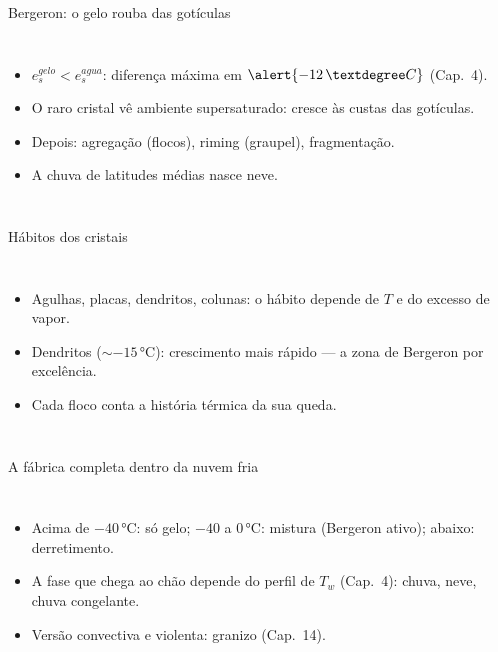 \documentclass[aspectratio=169,11pt]{beamer}
\begin{document}
\begin{frame}{Bergeron: o gelo rouba das gotículas}
  \begin{columns}
    \begin{itemize}
      \item $e_s^{gelo} < e_s^{agua}$: diferença máxima em
            $\alert{-12\,°C}$ (Cap.~4).
      \item O raro cristal vê ambiente supersaturado: cresce às custas
            das gotículas.
      \item Depois: agregação (flocos), riming (graupel),
            fragmentação.
      \item A chuva de latitudes médias nasce \alert{neve}.
    \end{itemize}
  \end{columns}
\end{frame}

\begin{frame}{Hábitos dos cristais}
  \begin{columns}
    \begin{itemize}
      \item Agulhas, placas, dendritos, colunas: o hábito depende de
            $T$ e do excesso de vapor.
      \item Dendritos ($\sim-15\,°$C): crescimento mais rápido — a zona
            de Bergeron por excelência.
      \item Cada floco conta a história térmica da sua queda.
    \end{itemize}
  \end{columns}
\end{frame}

\begin{frame}{A fábrica completa dentro da nuvem fria}
  \begin{columns}
    \begin{itemize}
      \item Acima de $-40\,°$C: só gelo; $-40$ a $0\,°$C: mistura
            (Bergeron ativo); abaixo: derretimento.
      \item A fase que chega ao chão depende do perfil de $T_w$
            (Cap.~4): chuva, neve, chuva congelante.
      \item Versão convectiva e violenta: granizo (Cap.~14).
    \end{itemize}
  \end{columns}
\end{frame}
\end{document}

